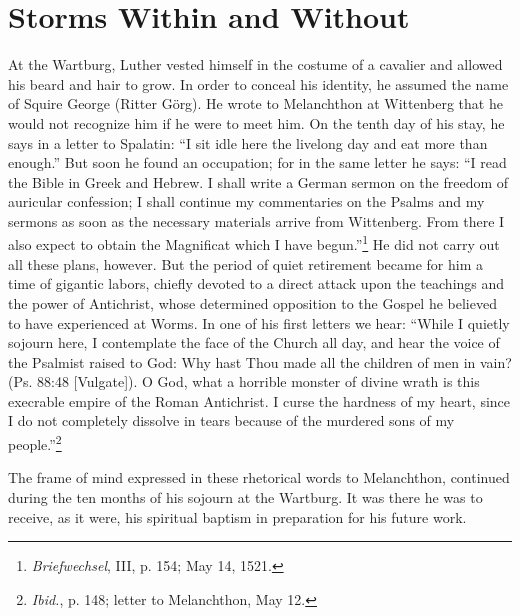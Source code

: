 \section{Storms Within and Without}

At the Wartburg, Luther vested himself in the costume of a
cavalier and allowed his beard and hair to grow. In order to conceal
his identity, he assumed the name of Squire George (Ritter Görg).
He wrote to Melanchthon at Wittenberg that he would not recognize
him if he were to meet him. On the tenth day of his stay, he says
in a letter to Spalatin: “I sit idle here the livelong day and eat more
than enough.” But soon he found an occupation; for in the same
letter he says: “I read the Bible in Greek and Hebrew. I shall write
a German sermon on the freedom of auricular confession; I shall
continue my commentaries on the Psalms and my sermons as soon
as the necessary materials arrive from Wittenberg. From there I also
expect to obtain the Magnificat which I have begun.”\footnote{\textit{Briefwechsel}, III, p. 154; May 14, 1521.}
He did
not carry out all these plans, however. But the period of quiet retirement
became for him a time of gigantic labors, chiefly devoted to
a direct attack upon the teachings and the power of Antichrist,
whose determined opposition to the Gospel he believed to have experienced
at Worms. In one of his first letters we hear: “While I
quietly sojourn here, I contemplate the face of the Church all day,
and hear the voice of the Psalmist raised to God: Why hast Thou
made all the children of men in vain? (Ps. 88:48 [Vulgate]).
O God, what a horrible monster of divine wrath is this execrable empire of
the Roman Antichrist. I curse the hardness of my heart, since I
do not completely dissolve in tears because of the murdered sons of
my people.”\footnote{\textit{Ibid.}, p. 148; letter to Melanchthon, May 12.}

The frame of mind expressed in these rhetorical words to Melanchthon,
continued during the ten months of his sojourn at the
Wartburg. It was there he was to receive, as it were, his spiritual
baptism in preparation for his future work.

